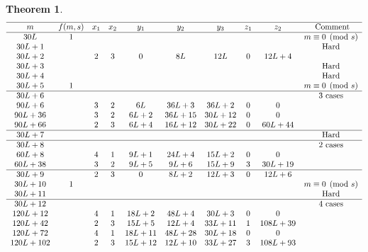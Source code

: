 \documentclass[12pt]{article}
\newtheorem{theoremfoo}{Theorem}[section] %
\newenvironment{theorem}{\pagebreak[1]\begin{theoremfoo}}{\end{theoremfoo}}
\begin{document}
\begin{theorem}
\[
\begin{array}{cccccccccc}
\hline
m            & f(m,s) & x_1 & x_2 & y_1  & y_2    & y_3       & z_1 & z_2 & \hbox{ Comment}   \cr
\hline
30L      & 1    &     &     &      &        &           &     &    & m\equiv 0 \pmod s\cr 
30L+1    &        &     &     &      &        &           &     &       &  \hbox{Hard}\cr
30L+2   &        & 2   & 3   & 0    & 8L     & 12L       & 0   & 12L+4 & \cr
30L+3    &        &     &     &      &        &           &     &       &  \hbox{Hard}\cr
30L+4    &        &     &     &      &        &           &     &       &  \hbox{Hard}\cr
30L+5     & 1    &     &     &      &        &           &     &    & m\equiv 0 \pmod s\cr 
\hline
30L+6          &        &     &     &      &        &           &     &       &  \hbox{3 cases}\cr
90L+6          &        & 3   & 2   & 6L   & 36L+3  & 36L+2     & 0   & 0     &  \cr 
90L+36         &        & 3   & 2   & 6L+2 & 36L+15 & 30L+12    & 0   & 0     &  \cr
90L+66         &        & 2   & 3   & 6L+4 & 16L+12 & 30L+22    & 0   & 60L+44&  \cr
\hline
30L+7          &        &     &     &      &        &           &     &       &  \hbox{Hard}\cr
\hline
30L+8          &        &     &     &      &        &           &     &       &  \hbox{ 2 cases }\cr
60L+8          &        & 4   & 1   & 9L+1 & 24L+4  & 15L+2     & 0   & 0     &  \cr
60L+38         &        & 3   & 2   & 9L+5 & 9L+6   & 15L+9     & 3   & 30L+19&  \cr
\hline
30L+9  &        & 2   & 3   & 0    &8L+2    & 12L+3     & 0   & 12L+6&                     \cr 
30L+10          & 1    &     &     &      &        &           &     &    & m\equiv 0 \pmod s\cr 
30L+11           &        &     &     &      &        &           &     &       &  \hbox{Hard}\cr
\hline
30L+12         &        &     &     &      &        &           &     &       &  \hbox{ 4 cases }\cr
120L+12        &        & 4   & 1   & 18L+2 & 48L+4  & 30L+3     & 0   & 0     & \cr
120L+42        &        & 2   & 3   & 15L+5 & 12L+4  & 33L+11    & 1   & 108L+39 &  \cr
120L+72        &        & 4   & 1   & 18L+11& 48L+28 & 30L+18    & 0   & 0     &  \cr
120L+102       &        & 2   & 3   & 15L+12& 12L+10 & 33L+27    & 3   & 108L+93  &  \cr
\end{array}
\]

\vfill\eject


\end{theorem}
\end{document}
